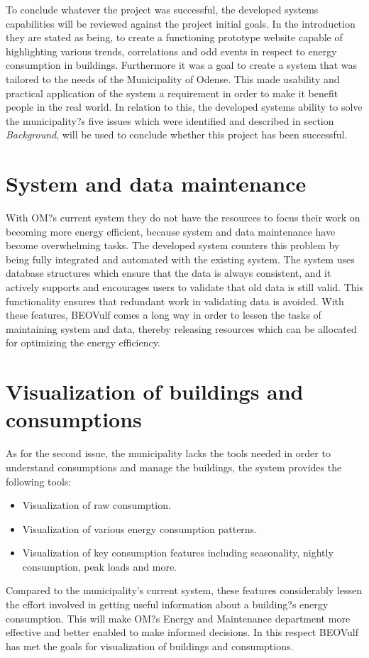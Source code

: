 To conclude whatever the project was successful, the developed systems capabilities will be reviewed against the project initial goals. In the introduction they are stated as being, to create a functioning prototype website capable of highlighting various trends, correlations and odd events in respect to energy consumption in buildings. Furthermore it was a goal to create a system that was tailored to the needs of the Municipality of Odense. This made usability and practical application of the system a requirement in order to make it benefit people in the real world. In relation to this, the developed systems ability to solve the municipality?s five issues which were identified and described in section \emph{Background}, will be used to conclude whether this project has been successful.
\section{System and data maintenance}
With OM?s current system they do not have the resources to focus their work on becoming more energy efficient, because system and data maintenance have become overwhelming tasks. The developed system counters this problem by being fully integrated and automated with the existing system. The system uses database structures which ensure that the data is always consistent, and it actively supports and encourages users to validate that old data is still valid. This functionality ensures that redundant work in validating data is avoided. With these features, BEOVulf comes a long way in order to lessen the tasks of maintaining system and data, thereby releasing resources which can be allocated for optimizing the energy efficiency.
\section{Visualization of buildings and consumptions}
As for the second issue, the municipality lacks the tools needed in order to understand consumptions and manage the buildings, the system provides the following tools:
\begin{itemize}
\item Visualization of raw consumption.
\item Visualization of various energy consumption patterns.
\item Visualization of key consumption features including seasonality, nightly consumption, peak loads and more.
\end{itemize}
Compared to the municipality's current system, these features considerably lessen the effort involved in getting useful information about a building?s energy consumption. This will make OM?s Energy and Maintenance department more effective and better enabled to make informed decisions. In this respect BEOVulf has met the goals for visualization of buildings and consumptions.
